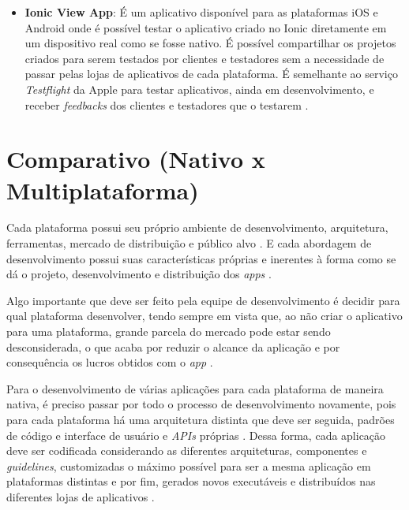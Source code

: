 \begin{itemize}
    \item \textbf{Ionic View App}: É um aplicativo disponível para as plataformas iOS e Android onde é possível testar o 
    aplicativo criado no Ionic diretamente em um dispositivo real como se fosse nativo. É possível compartilhar os projetos criados para serem
    testados por clientes e testadores sem a necessidade de passar pelas lojas de aplicativos de cada plataforma. É semelhante ao serviço 
    \textit{Testflight} da Apple para testar aplicativos, ainda em desenvolvimento, e receber \textit{feedbacks} dos clientes e testadores que o testarem \cite{drifty_ionic_2016-5}. 
     
\end{itemize}

\section{Comparativo (Nativo x Multiplataforma)} \label{section:comparativo}



Cada plataforma possui seu próprio ambiente de desenvolvimento, arquitetura, ferramentas, mercado de distribuição e público alvo \cite{shakshuki_4th_2013}.
E cada abordagem de desenvolvimento possui suas características próprias e inerentes à forma como se dá o projeto, desenvolvimento e distribuição dos \textit{apps} \cite{corral_ant_2012}.

Algo importante que deve ser feito pela equipe de desenvolvimento é decidir para qual plataforma desenvolver, tendo sempre em vista que, ao não criar o aplicativo para uma plataforma, grande parcela do mercado pode estar sendo desconsiderada, o que acaba por reduzir o alcance
da aplicação e por consequência os lucros obtidos com o \textit{app} \cite{corral_ant_2012}. 

Para o desenvolvimento de várias aplicações para cada plataforma de maneira nativa, é preciso passar por todo o processo de desenvolvimento novamente, 
pois para cada plataforma há uma arquitetura distinta que deve ser seguida, padrões de código e interface de usuário e \textit{APIs} próprias \cite{holzinger_making_2012}.
Dessa forma, cada aplicação deve ser codificada considerando as diferentes arquiteturas, componentes e \textit{guidelines}, customizadas o máximo possível 
para ser a mesma aplicação em plataformas distintas e por fim, gerados novos executáveis e distribuídos nas diferentes lojas de aplicativos \cite{corral_ant_2012}.

